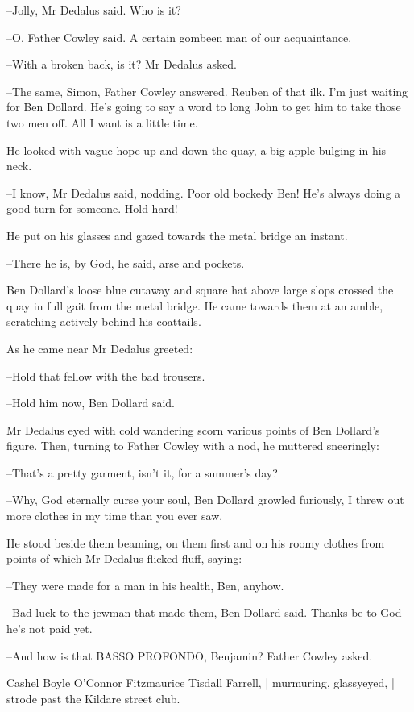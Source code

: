 --Jolly,
Mr Dedalus said.
Who is it?

--O,
Father Cowley said.
A certain gombeen man of our acquaintance.

--With a broken back, is it?
Mr Dedalus asked.

--The same, Simon,
Father Cowley answered.
Reuben of that ilk.
I'm just
waiting for Ben Dollard.
He's going to say a word to long John
to get him
to take those two men off.
All I want is a little time.

He looked with vague hope up and down the quay,
a big apple bulging in
his neck.

--I know,
Mr Dedalus said, nodding.
Poor old bockedy Ben!
He's always
doing a good turn for someone.
Hold hard!

He put on his glasses
and gazed towards the metal bridge an instant.

--There he is, by God, he said,
arse and pockets.

Ben Dollard's loose blue cutaway and square hat above large slops
crossed
the quay in full gait
from the metal bridge.
He came towards them at an
amble,
scratching actively behind his coattails.

As he came near
Mr Dedalus greeted:

--Hold that fellow with the bad trousers.

--Hold him now,
Ben Dollard said.

Mr Dedalus eyed with cold wandering scorn
various points of Ben Dollard's
figure.
Then,
turning to Father Cowley with a nod,
he muttered
sneeringly:

--That's a pretty garment, isn't it,
for a summer's day?

--Why, God eternally curse your soul,
Ben Dollard growled furiously,
I
threw out more clothes in my time than you ever saw.

He stood beside them beaming,
on them first and on his roomy clothes
from
points of which Mr Dedalus flicked fluff,
saying:

--They were made for a man in his health, Ben, anyhow.

--Bad luck to the jewman that made them,
Ben Dollard said.
Thanks be to
God he's not paid yet.

--And how is that BASSO PROFONDO, Benjamin?
Father Cowley asked.

Cashel Boyle O'Connor Fitzmaurice Tisdall Farrell, |
murmuring, glassyeyed, |
strode past the Kildare street club.


